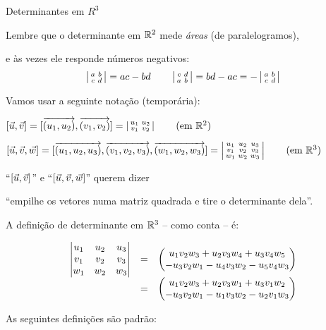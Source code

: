 \documentclass[oneside]{book}
\begin{document}
 {Determinantes em $R^3$}

\ssk

Lembre que o determinante em $\mathbb{R}^2$ mede {\sl áreas} (de paralelogramos),

e às vezes ele responde números negativos:
%
$$\left |\begin{smallmatrix}a&b\\c&d\\\end{smallmatrix}\right |
  = ac-bd \qquad
  \left |\begin{smallmatrix}c&d\\a&b\\\end{smallmatrix}\right | = bd-ac = -\left |\begin{smallmatrix}a&b\\c&d\\\end{smallmatrix}\right |
$$

Vamos usar a seguinte notação (temporária):

$[\uu,\vv]
  = [\V(u_1, u_2), \V(v_1, v_2)]
  = \vsm{u_1 & u_2 \\ v_1 & v_2 \\}
  \qquad \text{(em $\R^2$)}
$

$[\uu,\vv,\ww]
  = [\V(u_1, u_2, u_3), \V(v_1, v_2, v_3), \V(w_1, w_2, w_3)]
  = \vsm{u_1 & u_2 & u_3 \\ v_1 & v_2 & v_3 \\ w_1 & w_2 & w_3 \\}
  \qquad \text{(em $\R^3$)}
$

``$[{\vec u},{\vec v}]$'' e ``$[{\vec u},{\vec v},{\vec w}]$'' querem dizer

``empilhe os vetores numa matriz quadrada e tire o determinante dela''.

\msk

A definição de determinante em $\mathbb{R}^3$ -- como conta -- é:

$$\begin{array}{rcl}
  \left |\begin{matrix}u_1 & u_2 & u_3 \\ v_1 & v_2 & v_3 \\ w_1 & w_2 & w_3 \\\end{matrix}\right |
  &=& \left (\begin{matrix}u_1v_2w_3 + u_2v_3w_4 + u_3v_4w_5 \\
         -u_3v_2w_1 - u_4v_3w_2 - u_5v_4w_3 \\
        \end{matrix}\right ) \\
  &=& \left (\begin{matrix}u_1v_2w_3 + u_2v_3w_1 + u_3v_1w_2 \\
         -u_3v_2w_1 - u_1v_3w_2 - u_2v_1w_3 \\
        \end{matrix}\right )
  \end{array}
$$

\def\ii{\vec{\mathbf{i}}}
\def\jj{\vec{\mathbf{j}}}
\def\kk{\vec{\mathbf{k}}}

As seguintes definições são padrão:
\end{document}
